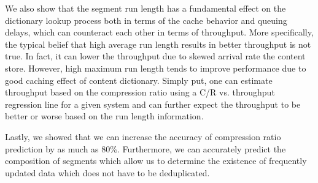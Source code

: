 We also show that the segment run length has a fundamental effect on the dictionary lookup process both in terms of the cache behavior and queuing delays, which can counteract each other in terms of throughput. More specifically, the typical belief that high average run length results in better throughput is not true. In fact, it can lower the throughput due to skewed arrival rate the content store. However, high maximum run length tends to improve performance due to good caching effect of content dictionary. Simply put, one can estimate throughput based on the compression ratio using a C/R vs. throughput regression line for a given system and can further expect the throughput to be better or worse based on the run length information.

Lastly, we showed that we can increase the accuracy of compression ratio prediction by as much as 80\%. Furthermore, we can accurately predict the composition of segments which allow us to determine the existence of frequently updated data which does not have to be deduplicated. 

